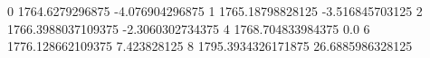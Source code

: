 0 1764.6279296875 -4.076904296875
1 1765.18798828125 -3.516845703125
2 1766.3988037109375 -2.3060302734375
4 1768.704833984375 0.0
6 1776.128662109375 7.423828125
8 1795.3934326171875 26.6885986328125
